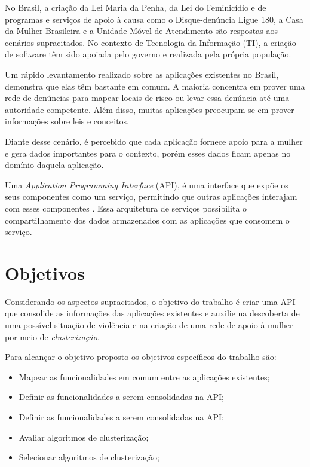 No Brasil, a criação da Lei Maria da Penha, da Lei do Feminicídio e de programas e serviços de apoio à causa 
como o Disque-denúncia Ligue 180, a Casa da Mulher Brasileira e a Unidade Móvel de Atendimento são respostas aos cenários supracitados. No contexto de Tecnologia da Informação (TI), a criação de software têm sido apoiada pelo governo e realizada pela própria população.

Um rápido levantamento realizado sobre as aplicações existentes no Brasil, demonstra que elas têm bastante em comum. A maioria concentra em prover uma rede de denúncias para mapear locais de risco ou levar essa
denúncia até uma autoridade competente. Além disso, muitas aplicações preocupam-se em prover informações sobre leis e conceitos.

Diante desse cenário, é percebido que cada aplicação fornece apoio para a mulher e 
gera dados importantes para o contexto, porém esses dados ficam apenas no domínio daquela aplicação. 

Uma \textit{Application Programming Interface} (API), é uma interface que expõe os seus componentes como um serviço, permitindo que outras aplicações interajam com esses componentes \cite{wagh2012comparative, understanding_web}. Essa arquitetura de serviços possibilita o compartilhamento dos dados armazenados com as aplicações que consomem o serviço. 

\section{Objetivos}

Considerando os aspectos supracitados, o objetivo do trabalho é criar uma API que consolide as informações das aplicações existentes e auxilie na descoberta de uma possível situação de violência e na criação de uma rede de apoio à mulher por meio de \textit{clusterização}.

Para alcançar o objetivo proposto os objetivos específicos do trabalho são:
\begin{itemize}
	\item Mapear as funcionalidades em comum entre as aplicações existentes;
	\item Definir as funcionalidades a serem consolidadas na API;
	\item Definir as funcionalidades a serem consolidadas na API;
	\item Avaliar algoritmos de clusterização;
	\item Selecionar algoritmos de clusterização;
\end{itemize}

